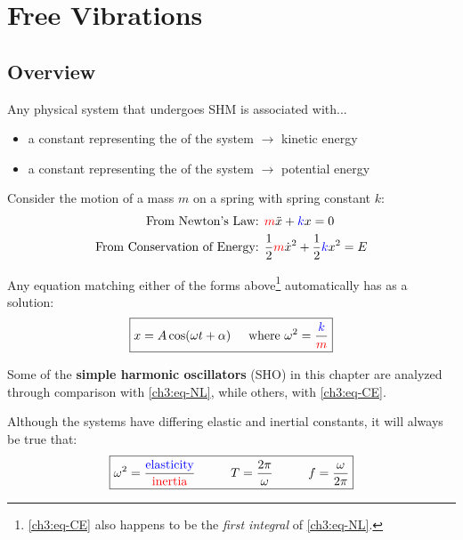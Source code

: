 \chapter{Free Vibrations}

\section{Overview}
Any physical system that undergoes SHM is associated with...
\begin{itemize}
	\item a constant representing the  of the system $\longrightarrow$ kinetic energy
	\item a constant representing the  of the system $\longrightarrow$ potential energy
\end{itemize}

Consider the motion of a mass $m$ on a spring with spring constant $k$:
\begin{align}
	\text{From Newton's Law: }&
	\textcolor{red}{m}\ddot{x} + \textcolor{blue}{k}x = 0 \label{ch3:eq-NL} \\
	\text{From Conservation of Energy: }&
	\frac{1}{2}\textcolor{red}{m}\dot{x}^2 + \frac{1}{2}\textcolor{blue}{k}x^2 = E \label{ch3:eq-CE}
\end{align}

Any equation matching either of the forms above\footnote{\eqref{ch3:eq-CE} also happens to be the \textit{first integral} of  \eqref{ch3:eq-NL}.} automatically has as a solution:
\begin{equation}
\boxed{x = A \cos(\omega t+\alpha)\hspace{0.5cm}\text{where }\omega^2 = \frac{\textcolor{blue}{k}}{\textcolor{red}{m}}} \label{ch3:eq-SHM-soln}
\end{equation}

Some of the \textbf{simple harmonic oscillators} (SHO) in this chapter are analyzed through comparison with \eqref{ch3:eq-NL}, while others, with \eqref{ch3:eq-CE}.

Although the systems have differing elastic and inertial constants, it will always be true that:
\begin{equation}
	\boxed{
		\omega^2 = \frac{\kcol{\text{elasticity}}}{\mcol{\text{inertia}}} \hhtab 
		T = \frac{2\pi}{\omega} \hhtab 
		f = \frac{\omega}{2\pi}}
\end{equation}

